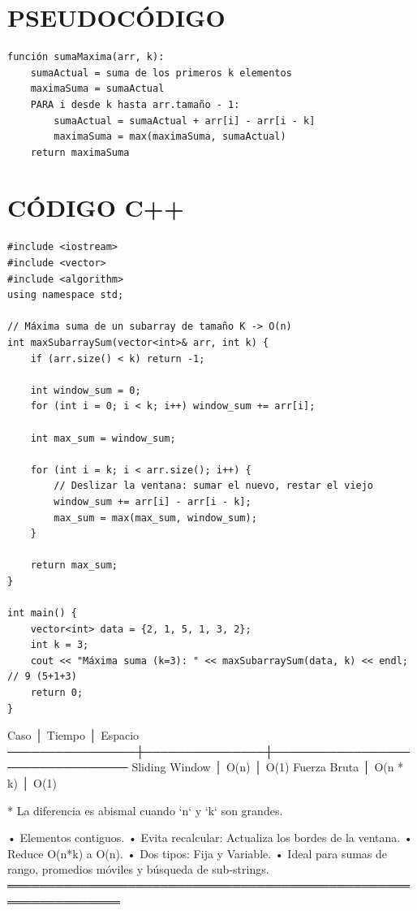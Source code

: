 \section*{PSEUDOCÓDIGO}
\hrulefill
\begin{verbatim}
función sumaMaxima(arr, k):
    sumaActual = suma de los primeros k elementos
    maximaSuma = sumaActual
    PARA i desde k hasta arr.tamaño - 1:
        sumaActual = sumaActual + arr[i] - arr[i - k]
        maximaSuma = max(maximaSuma, sumaActual)
    return maximaSuma
\end{verbatim}
\section*{CÓDIGO C++}
\hrulefill
\begin{lstlisting}
#include <iostream>
#include <vector>
#include <algorithm>
using namespace std;

// Máxima suma de un subarray de tamaño K -> O(n)
int maxSubarraySum(vector<int>& arr, int k) {
    if (arr.size() < k) return -1;

    int window_sum = 0;
    for (int i = 0; i < k; i++) window_sum += arr[i];

    int max_sum = window_sum;

    for (int i = k; i < arr.size(); i++) {
        // Deslizar la ventana: sumar el nuevo, restar el viejo
        window_sum += arr[i] - arr[i - k];
        max_sum = max(max_sum, window_sum);
    }

    return max_sum;
}

int main() {
    vector<int> data = {2, 1, 5, 1, 3, 2};
    int k = 3;
    cout << "Máxima suma (k=3): " << maxSubarraySum(data, k) << endl; // 9 (5+1+3)
    return 0;
}
\end{lstlisting}
\begin{dsacomplejidad}
Caso            │ Tiempo        │ Espacio
  ────────────────┼───────────────┼────────────────────────────────
  Sliding Window  │ O(n)          │ O(1)
  Fuerza Bruta    │ O(n * k)      │ O(1)

* La diferencia es abismal cuando `n` y `k` son grandes.
\end{dsacomplejidad}
\begin{dsaentrevistas}

\end{dsaentrevistas}
\begin{dsaresumen}
• Elementos contiguos.
• Evita recalcular: Actualiza los bordes de la ventana.
• Reduce O(n*k) a O(n).
• Dos tipos: Fija y Variable.
• Ideal para sumas de rango, promedios móviles y búsqueda de sub-strings.
════════════════════════════════════════════════════════════════
\end{dsaresumen}

